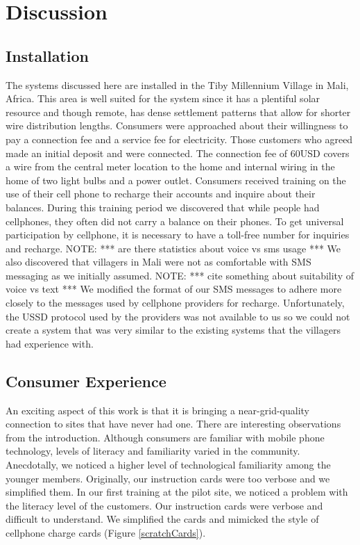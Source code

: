\documentclass[conference]{IEEEtran}
\newcommand{\note}[1]{{\color{red} NOTE: *** #1 ***}}
\begin{document}
\section{Discussion}

\subsection{Installation}
The systems discussed here are installed in the Tiby Millennium Village
in Mali, Africa.  This area is well suited for the system since it has
a plentiful solar resource and though remote, has dense settlement
patterns that allow for shorter wire distribution lengths.  Consumers were
approached about their willingness to pay a connection fee and a service
fee for electricity.  Those customers who agreed made an initial deposit
and were connected.
The connection fee of 60USD covers a wire from the central meter location
to the home and internal wiring in the home of two light bulbs and a
power outlet.  Consumers received training on the use of their cell phone
to recharge their accounts and inquire about their balances.
During this
training period we discovered that while people had cellphones, they often
did not carry a balance on their phones.  To get universal participation
by cellphone, it is necessary to have a toll-free number for inquiries
and recharge.
\note{are there statistics about voice vs sms usage}
We also discovered that villagers in Mali were not as comfortable
with SMS messaging as we initially assumed.  \note{cite something about
suitability of voice vs text}  We modified the format of our
SMS messages to adhere more closely to the messages used by cellphone
providers for recharge.  Unfortunately, the USSD protocol used by the
providers was not available to us so we could not create a system that was
very similar to the existing systems that the villagers had experience with.

\subsection{Consumer Experience}
An exciting aspect of this work is that it is bringing a near-grid-quality
connection to sites that have never had one.
There are interesting observations from
the introduction.  Although consumers are familiar with mobile phone technology,
levels of literacy and familiarity varied in the community.  Anecdotally, we
noticed a higher level of technological familiarity among the younger members.
Originally, our instruction cards were too verbose and we simplified them.
In our first training at the pilot site, we noticed a problem with the
literacy level of the customers.  Our instruction cards were verbose and
difficult to understand.  We simplified the cards and mimicked
the style of cellphone charge cards (Figure \ref{scratchCards}).
\end{document}
